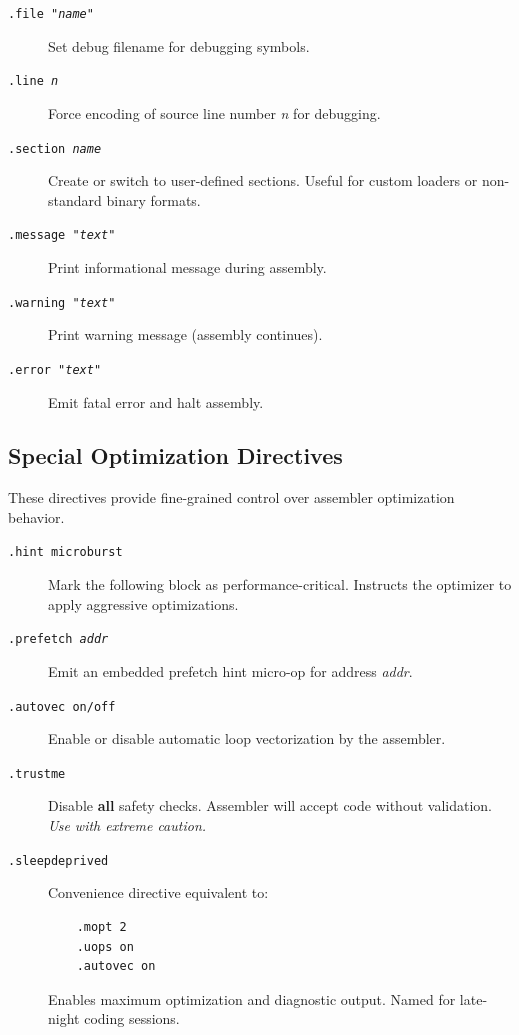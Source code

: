 \documentclass[12pt]{article}
\begin{document}
\begin{description}
\item[\texttt{.file "\textit{name}"}] Set debug filename for debugging symbols.

\item[\texttt{.line \textit{n}}] Force encoding of source line number \textit{n} for debugging.

\item[\texttt{.section \textit{name}}] Create or switch to user-defined sections. Useful for custom loaders or non-standard binary formats.

\item[\texttt{.message "\textit{text}"}] Print informational message during assembly.

\item[\texttt{.warning "\textit{text}"}] Print warning message (assembly continues).

\item[\texttt{.error "\textit{text}"}] Emit fatal error and halt assembly.
\end{description}

\subsection{Special Optimization Directives}

These directives provide fine-grained control over assembler optimization behavior.

\begin{description}
\item[\texttt{.hint microburst}] Mark the following block as performance-critical. Instructs the optimizer to apply aggressive optimizations.

\item[\texttt{.prefetch \textit{addr}}] Emit an embedded prefetch hint micro-op for address \textit{addr}.

\item[\texttt{.autovec on/off}] Enable or disable automatic loop vectorization by the assembler.

\item[\texttt{.trustme}] Disable \textbf{all} safety checks. Assembler will accept code without validation. \textit{Use with extreme caution.}

\item[\texttt{.sleepdeprived}] Convenience directive equivalent to:
\begin{verbatim}
    .mopt 2
    .uops on
    .autovec on
\end{verbatim}
Enables maximum optimization and diagnostic output. Named for late-night coding sessions.
\end{description}
\end{document}

